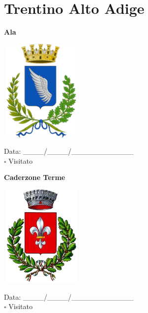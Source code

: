 \documentclass[a5paper,12pt]{article}
\begin{document}
\newpage

\section*{Trentino Alto Adige}

\newpage

\noindent
\begin{minipage}[t]{0.45\textwidth}
    \begin{center}
        \textbf{Ala}
    \end{center}
    \vspace{-0.5cm} %
    \begin{center}
        \includegraphics[height= 5cm, width=4cm]{Trentino Alto Adige/Stemma Ala.png}
    \end{center}
    \vspace{-0.4cm} %
    \begin{flushleft}
        Data: \_\_\_\_/\_\_\_\_/\_\_\_\_\_\_\_\_\_\_\_\_ \\
        $\square$ Visitato
    \end{flushleft}
\end{minipage}
\hfill
\noindent
\begin{minipage}[t]{0.45\textwidth}
    \begin{center}
        \textbf{Caderzone Terme}
    \end{center}
    \vspace{-0.5cm} %
    \begin{center}
        \includegraphics[height= 5cm, width=4cm]{Trentino Alto Adige/Stemma Caderzone Terme.png}
    \end{center}
    \vspace{-0.4cm} %
    \begin{flushleft}
        Data: \_\_\_\_/\_\_\_\_/\_\_\_\_\_\_\_\_\_\_\_\_ \\
        $\square$ Visitato
    \end{flushleft}
\end{minipage}
\hfill
\end{document}
